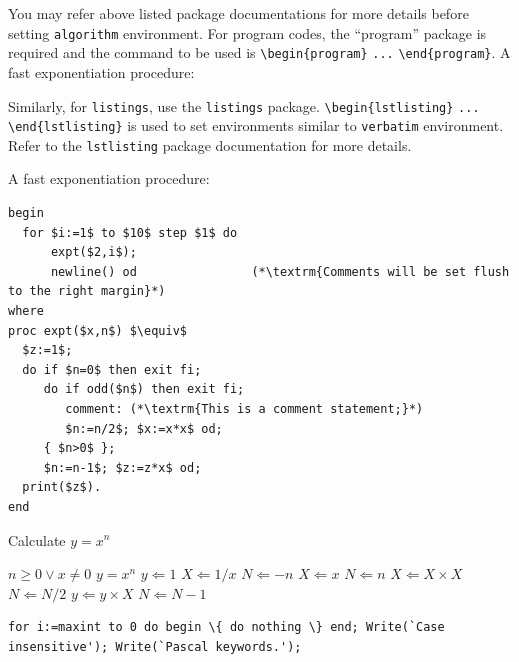 \documentclass[sn-vancouver,Numbered,pdflatex]{sn-jnl}
\theoremstyle{remark}
\theoremstyle{definition}
\begin{document}
You may refer above listed package documentations for more details
before setting \texttt{algorithm} environment. For program codes, the
``program'' package is required and the command to be used is
\texttt{\textbackslash{}begin\{program\}} \texttt{...}
\texttt{\textbackslash{}end\{program\}}. A fast exponentiation
procedure:

Similarly, for \texttt{listings}, use the \texttt{listings} package.
\texttt{\textbackslash{}begin\{lstlisting\}} \texttt{...}
\texttt{\textbackslash{}end\{lstlisting\}} is used to set environments
similar to \texttt{verbatim} environment. Refer to the
\texttt{lstlisting} package documentation for more details.

A fast exponentiation procedure:

\begin{lstlisting}
begin
  for $i:=1$ to $10$ step $1$ do
      expt($2,i$);  
      newline() od                (*\textrm{Comments will be set flush to the right margin}*)
where
proc expt($x,n$) $\equiv$
  $z:=1$;
  do if $n=0$ then exit fi;
     do if odd($n$) then exit fi;                 
        comment: (*\textrm{This is a comment statement;}*)
        $n:=n/2$; $x:=x*x$ od;
     { $n>0$ };
     $n:=n-1$; $z:=z*x$ od;
  print($z$). 
end
\end{lstlisting}

\begin{algorithm}
\caption{Calculate $y = x^n$}\label{algo1}
\begin{algorithmic}[1]
\Require $n \geq 0 \vee x \neq 0$
\Ensure $y = x^n$ 
\State $y \Leftarrow 1$
\label{algln2}
        \State $X \Leftarrow 1 / x$
        \State $N \Leftarrow -n$
\Else
        \State $X \Leftarrow x$
        \State $N \Leftarrow n$
\EndIf
{}
            \State $X \Leftarrow X \times X$
            \State $N \Leftarrow N / 2$
        \Else[$N$ is odd]
            \State $y \Leftarrow y \times X$
            \State $N \Leftarrow N - 1$
        \EndIf
\EndWhile
\end{algorithmic}
\end{algorithm}

\begin{minipage}{\hsize}

\lstset{frame=single,framexleftmargin=-1pt,framexrightmargin=-17pt,framesep=12pt,linewidth=0.98\textwidth,language=pascal}

\begin{lstlisting}
for i:=maxint to 0 do begin \{ do nothing \} end; Write(`Case
insensitive'); Write(`Pascal keywords.');

\end{lstlisting}

\end{minipage}
\end{document}
